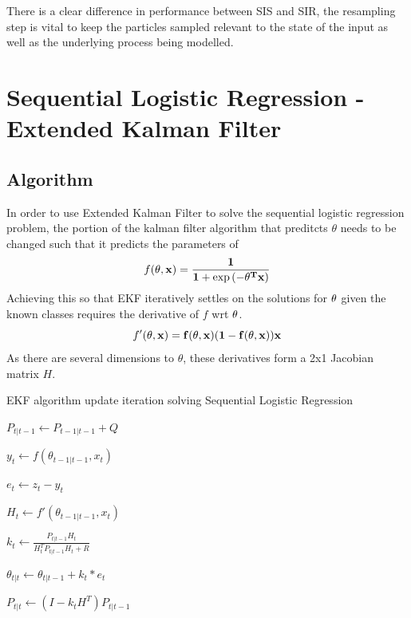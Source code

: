\documentclass[sigconf]{acmart}
\begin{document}
There is a clear difference in performance between SIS and SIR, the resampling step is vital to keep the particles sampled relevant to the state of the input as well as the underlying process being modelled.
\section{Sequential Logistic Regression - Extended Kalman Filter}
\subsection{Algorithm}
In order to use Extended Kalman Filter to solve the sequential logistic regression problem, the portion of the kalman filter algorithm that preditcts $\theta$ needs to be changed such that it predicts the parameters of $$f(\bf{\theta}, \bf{x}) = \frac{1}{1 + \exp{(-\bf{\theta}^T\bf{x})}}$$
Achieving this so that EKF iteratively settles on the solutions for $\bf{\theta}$ given the known classes requires the derivative of $f$ wrt $\bf{\theta}$. $$f'(\bf{\theta}, \bf{x}) = f(\bf{\theta}, \bf{x})(1 - f(\bf{\theta}, \bf{x}))\bf{x}$$
As there are several dimensions to $\theta$, these derivatives form a 2x1 Jacobian matrix $H$.
\begin{algorithm2e}
  \caption{EKF algorithm update iteration solving Sequential Logistic Regression}
  \label{alg:EKF}
  \DontPrintSemicolon
  $P_{t|t-1} \gets P_{t-1|t-1} + Q$\;

  $y_t \gets f(\theta_{t-1|t-1}, x_t) $\;

  $e_t \gets z_t - y_t $\;

  $H_t \gets f'(\theta_{t-1|t-1}, x_t) $\;

  $k_t \gets \frac{P_{t|t-1}H_t}{H_{t}^{T}P_{t|t-1}H_t + R} $\;

  $\theta_{t|t} \gets \theta_{t|t-1} + k_t * e_t $\;

  $P_{t|t} \gets (I - k_{t}H^{T})P_{t|t-1}$\;
\end{algorithm2e}
\end{document}
